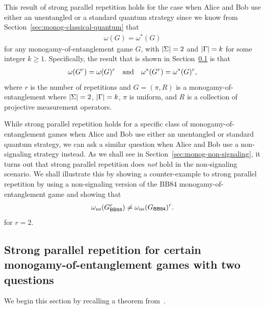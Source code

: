 This result of strong parallel repetition holds for the case when Alice and Bob use either an unentangled or a standard quantum strategy since we know from Section~\ref{sec:monog-classical-quantum} that 
\begin{align}
	\omega(G) = \omega^*(G)
\end{align}
for any monogamy-of-entanglement game $G$, with $\left\lvert \Sigma \right\rvert = 2$ and $\left\lvert \Gamma \right\rvert = k$ for some integer $k \geq 1$. Specifically, the result that is shown in Section~\ref{sec:monog-strong-parallel-rep} is that 
\begin{align}
	\omega(G^r) = \omega(G)^r \quad \textnormal{and} \quad \omega^*(G^r) = \omega^*(G)^r,
\end{align}
where $r$ is the number of repetitions and $G = (\pi,R)$ is a monogamy-of-entanglement where $\left\lvert \Sigma \right\rvert = 2$, $\left\lvert \Gamma \right\rvert = k$, $\pi$ is uniform, and $R$ is a collection of projective measurement operators. 

While strong parallel repetition holds for a specific class of monogamy-of-entanglement games when Alice and Bob use either an unentangled or standard quantum strategy, we can ask a similar question when Alice and Bob use a non-signaling strategy instead. As we shall see in Section~\ref{sec:monog-non-signaling}, it turns out that strong parallel repetition does \emph{not} hold in the non-signaling scenario. We shall illustrate this by showing a counter-example to strong parallel repetition by using a non-signaling version of the BB84 monogamy-of-entanglement game and showing that
\begin{align}
	\omega_{\ns}(G_{\BB84}^r) \not= \omega_{\ns}(G_{\BB84})^r.
\end{align}
for $r = 2$. 

\subsection{Strong parallel repetition for certain monogamy-of-entanglement games with two questions} \label{sec:monog-strong-parallel-rep}

We begin this section by recalling a theorem from~\cite{Tomamichel2013}.

